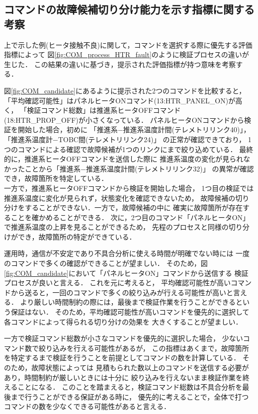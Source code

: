 \documentclass[11pt]{jsreport}
\begin{document}
\subsection{コマンドの故障候補切り分け能力を示す指標に関する考察}
上で示した例(ヒータ接触不良)に関して，コマンドを選択する際に優先する評価指標によって
図\ref{fig:COM_process_HTR_fault}のように検証プロセスの違いが生じた．
この結果の違いに基づき，提示された評価指標が持つ意味を考察する．

図\ref{fig:COM_candidate}にあるように提示された2つのコマンドを比較すると，
「平均確認可能性」はパネルヒータONコマンド(13:HTR\_PANEL\_ON)が高く，
「検証コマンド総数」は推進系ヒータOFFコマンド(18:HTR\_PROP\_OFF)が小さくなっている．
パネルヒータONコマンドから検証を開始した場合，初めに
「推進系−推進系温度計間(テレメトリリンク40)」，「推進系温度計−TOBC間(テレメトリリンク24)」
の正常が確認できており，
1つのコマンドによる確認で故障候補が1つのリンクにまで絞り込めている．
最終的に，推進系ヒータOFFコマンドを送信した際に%
推進系温度の変化が見られなかったことから「推進系−推進系温度計間(テレメトリリンク32)」
の異常が確認でき，故障箇所を特定している．\\
一方で，推進系ヒータOFFコマンドから検証を開始した場合，
1つ目の検証では推進系温度に変化が見られず，状態変化を確認できないため，
故障候補の切り分けをすることができない．一方で，故障候補の中に
確実に故障箇所が存在することを確かめることができる．
次に，2つ目のコマンド「パネルヒータON」で推進系温度の上昇を見ることができるため，
先程のプロセスと同様の切り分けができ，故障箇所の特定ができている．

運用時，通信が不安定であり不具合分析に使える時間が明確でない時には
一度のコマンドで多くの確認ができることが望ましい．
そのため，図\ref{fig:COM_candidate}において「パネルヒータON」コマンドから送信する
検証プロセスが良いと言える．
これを元に考えると，
平均確認可能性が高いコマンドから送ると，一回のコマンドで多くの絞り込みが行える可能性が高いと言える．
より厳しい時間制約の際には，最後まで検証作業を行うことができるという保証はない．
そのため，平均確認可能性が高いコマンドを優先的に選択して各コマンドによって得られる切り分けの効果を
大きくすることが望ましい．

一方で検証コマンド総数が小さなコマンドを優先的に選択した場合，
少ないコマンド数で絞り込みを行える可能性があるが，
この指標はあくまで，故障箇所を特定するまで検証を行うことを前提としてコマンドの数を計算している．
そのため，故障状態によっては
見積もられた数以上のコマンドを送信する必要があり，時間制約が厳しいときには十分に
絞り込みを行えないまま検証作業を終えることになる．
このことを踏まえると，検証コマンド総数は不具合分析を最後まで行うことができる保証がある時に，
優先的に考えることで，全体で打つコマンドの数を少なくできる可能性があると言える．
\end{document}
